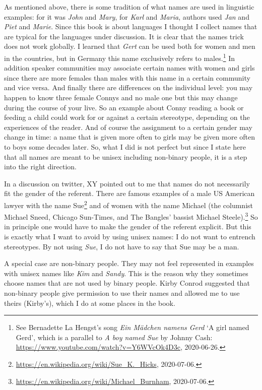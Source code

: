 As mentioned above, there is some tradition of what names are used in linguistic examples: for
 it was \emph{John} and \emph{Mary}, for  \emph{Karl} and \emph{Maria},  authors
used \emph{Jan} and \emph{Piet} and \emph{Marie}. Since this book is about  languages I
thought I collect names that are typical for the languages under discussion. It is clear that the
names trick does not work globally. I learned that \emph{Gert} can be used both for women and
men in the  countries, but in Germany this name exclusively refers to
males.\footnote{%
See Bernadette La Hengst's song \emph{Ein Mädchen namens Gerd} `A girl named Gerd', which is a parallel to \emph{A boy
  named Sue} by Johnny Cash: \url{https://www.youtube.com/watch?v=Y6WVcOk4D3c}, 2020-06-26.
} In
addition speaker communities may associate certain names with women and girls since there are more females
than males with this name in a certain community and vice versa. And finally there are differences
on the individual level: you may happen to know three female Connys and no male one but this may
change during the course of your live. So an example about Conny reading a book or feeding a child
could work for or against a certain stereotype, depending on the experiences of the reader. And of course the assignment to a certain gender may change in
time: a name that is given more often to girls may be given more often to boys some decades later. 
So, what I did is not perfect but since I state here that all names are meant to be unisex including
non-binary people, it is a step into the right direction.

In a discussion on twitter, XY pointed out to me that names do not necessarily fit the gender of the
referent. There are famous examples of a male US American lawyer with the name Sue\footnote{
\url{https://en.wikipedia.org/wiki/Sue_K._Hicks}, 2020-07-06.
} and of women with the name Michael (the columnist Michael Sneed, Chicago Sun-Times, and The
Bangles' bassist Michael Steele).\footnote{
  \url{https://en.wikipedia.org/wiki/Michael_Burnham}, 2020-07-06.
}
So in principle
one would have to make the gender of the referent explicit. But this is exactly what I want to avoid
by using unisex names: I do not want to entrench stereotypes. By not using \emph{Sue}, I do not have to say
that Sue may be a man.

A special case are non-binary people. They may not feel represented in examples with unisex
names like \emph{Kim} and \emph{Sandy}. This is the reason why they sometimes choose names that are
not used by binary people. Kirby Conrod suggested that non-binary people give permission to use their names and allowed me to
use theirs (Kirby's), which I do at some places in the book. 

